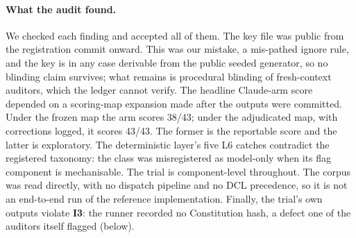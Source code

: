 \documentclass[11pt,letterpaper]{article}
\newcommand{\invariant}[1]{\textbf{I#1}}
\begin{document}
\paragraph{What the audit found.} We checked each finding and accepted all of them. The key file was public from the registration commit onward. This was our mistake, a mis-pathed ignore rule, and the key is in any case derivable from the public seeded generator, so no blinding claim survives; what remains is procedural blinding of fresh-context auditors, which the ledger cannot verify. The headline Claude-arm score depended on a scoring-map expansion made after the outputs were committed. Under the frozen map the arm scores 38/43; under the adjudicated map, with corrections logged, it scores 43/43. The former is the reportable score and the latter is exploratory. The deterministic layer's five L6 catches contradict the registered taxonomy: the class was misregistered as model-only when its flag component is mechanisable. The trial is component-level throughout. The corpus was read directly, with no dispatch pipeline and no DCL precedence, so it is not an end-to-end run of the reference implementation. Finally, the trial's own outputs violate \invariant{3}: the runner recorded no Constitution hash, a defect one of the auditors itself flagged (below).
\end{document}
